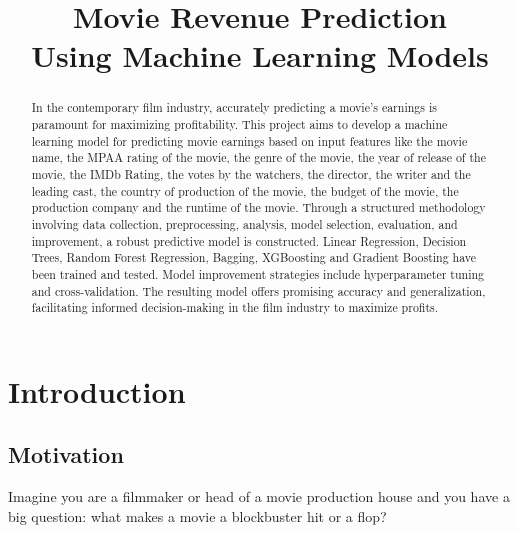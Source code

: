 \documentclass[conference]{IEEEtran}
\begin{document}
\title{Movie Revenue Prediction\\ Using Machine Learning Models}

\author{
     \vspace*{3.0pt}
    \and
     \vspace*{3.0pt}
}

\maketitle

\begin{abstract}
    In the contemporary film industry, accurately predicting a movie's earnings is paramount for maximizing profitability. This project aims to develop a machine learning model for predicting movie earnings based on input features like the movie name, the MPAA rating of the movie, the genre of the movie, the year of release of the movie, the IMDb Rating, the votes by the watchers, the director, the writer and the leading cast, the country of production of the movie, the budget of the movie, the production company and the runtime of the movie. Through a structured methodology involving data collection, preprocessing, analysis, model selection, evaluation, and improvement, a robust predictive model is constructed. Linear Regression, Decision Trees, Random Forest Regression, Bagging, XGBoosting and Gradient Boosting have been trained and tested. Model improvement strategies include hyperparameter tuning and cross-validation. The resulting model offers promising accuracy and generalization, facilitating informed decision-making in the film industry to maximize profits.
\end{abstract}

\IEEEpeerreviewmaketitle

\section{Introduction}
    \subsection{Motivation}
        Imagine you are a filmmaker or head of a movie production house and you have a big question: what makes a movie a blockbuster hit or a flop?
        
\end{document}
